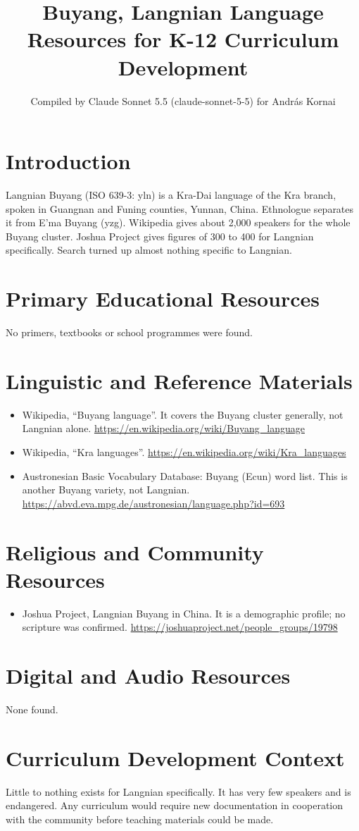 \documentclass[12pt]{article}
\title{Buyang, Langnian Language Resources for K-12 Curriculum Development}
\author{Compiled by Claude Sonnet 5.5 (claude-sonnet-5-5) for Andr\'as Kornai}
\date{}
\begin{document}
\maketitle

\section{Introduction}
Langnian Buyang (ISO 639-3: yln) is a Kra-Dai language of the Kra branch, spoken in Guangnan and Funing counties, Yunnan, China. Ethnologue separates it from E'ma Buyang (yzg). Wikipedia gives about 2,000 speakers for the whole Buyang cluster. Joshua Project gives figures of 300 to 400 for Langnian specifically. Search turned up almost nothing specific to Langnian.

\section{Primary Educational Resources}
No primers, textbooks or school programmes were found.

\section{Linguistic and Reference Materials}
\begin{itemize}
\item Wikipedia, ``Buyang language''. It covers the Buyang cluster generally, not Langnian alone. \url{https://en.wikipedia.org/wiki/Buyang_language}
\item Wikipedia, ``Kra languages''. \url{https://en.wikipedia.org/wiki/Kra_languages}
\item Austronesian Basic Vocabulary Database: Buyang (Ecun) word list. This is another Buyang variety, not Langnian. \url{https://abvd.eva.mpg.de/austronesian/language.php?id=693}
\end{itemize}

\section{Religious and Community Resources}
\begin{itemize}
\item Joshua Project, Langnian Buyang in China. It is a demographic profile; no scripture was confirmed. \url{https://joshuaproject.net/people_groups/19798}
\end{itemize}

\section{Digital and Audio Resources}
None found.

\section{Curriculum Development Context}
Little to nothing exists for Langnian specifically. It has very few speakers and is endangered. Any curriculum would require new documentation in cooperation with the community before teaching materials could be made.
\end{document}
